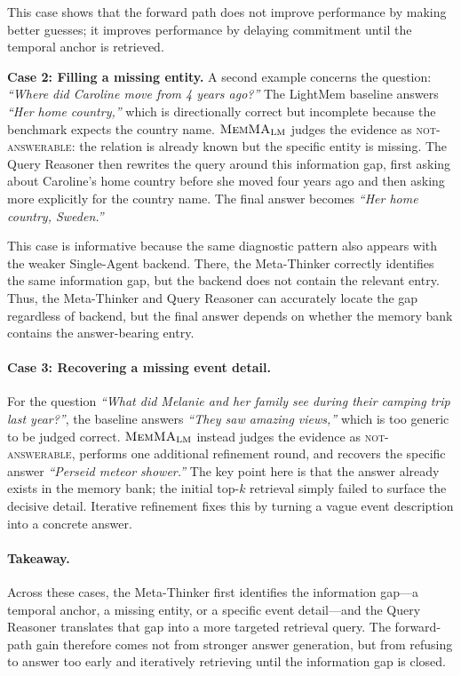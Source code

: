 This case shows that the forward path does not improve performance by making better guesses; it improves performance by delaying commitment until the temporal anchor is retrieved.

\noindent\textbf{Case 2: Filling a missing entity.}
A second example concerns the question: \emph{``Where did Caroline move from 4 years ago?''}
The LightMem baseline answers \emph{``Her home country,''} which is directionally correct but incomplete because the benchmark expects the country name.
$\textnormal{\textsc{MemMA}}_{\mathrm{LM}}$ judges the evidence as \textsc{not-answerable}: the relation is already known but the specific entity is missing.
The Query Reasoner then rewrites the query around this information gap, first asking about Caroline's home country before she moved four years ago and then asking more explicitly for the country name.
The final answer becomes \emph{``Her home country, Sweden.''}

This case is informative because the same diagnostic pattern also appears with the weaker Single-Agent backend.
There, the Meta-Thinker correctly identifies the same information gap, but the backend does not contain the relevant entry.
Thus, the Meta-Thinker and Query Reasoner can accurately locate the gap regardless of backend, but the final answer depends on whether the memory bank contains the answer-bearing entry.


\paragraph{Case 3: Recovering a missing event detail.}
For the question \emph{``What did Melanie and her family see during their camping trip last year?''}, the baseline answers \emph{``They saw amazing views,''} which is too generic to be judged correct.
$\textnormal{\textsc{MemMA}}_{\mathrm{LM}}$ instead judges the evidence as \textsc{not-answerable}, performs one additional refinement round, and recovers the specific answer \emph{``Perseid meteor shower.''}
The key point here is that the answer already exists in the memory bank; the initial top-$k$ retrieval simply failed to surface the decisive detail.
Iterative refinement fixes this by turning a vague event description into a concrete answer.

\paragraph{Takeaway.}
Across these cases, the Meta-Thinker first identifies the information gap---a temporal anchor, a missing entity, or a specific event detail---and the Query Reasoner translates that gap into a more targeted retrieval query.
The forward-path gain therefore comes not from stronger answer generation, but from refusing to answer too early and iteratively retrieving until the information gap is closed.


